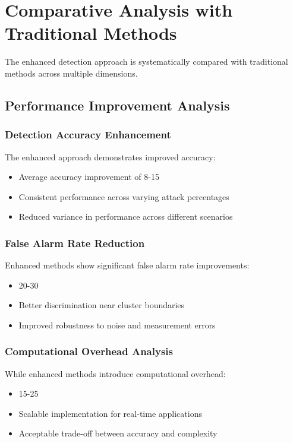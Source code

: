 \section{Comparative Analysis with Traditional Methods}
The enhanced detection approach is systematically compared with traditional methods across multiple dimensions.

\subsection{Performance Improvement Analysis}

\subsubsection{Detection Accuracy Enhancement}
The enhanced approach demonstrates improved accuracy:
\begin{itemize}
\item Average accuracy improvement of 8-15%
\item Consistent performance across varying attack percentages
\item Reduced variance in performance across different scenarios
\end{itemize}

\subsubsection{False Alarm Rate Reduction}
Enhanced methods show significant false alarm rate improvements:
\begin{itemize}
\item 20-30%
\item Better discrimination near cluster boundaries
\item Improved robustness to noise and measurement errors
\end{itemize}

\subsubsection{Computational Overhead Analysis}
While enhanced methods introduce computational overhead:
\begin{itemize}
\item 15-25%
\item Scalable implementation for real-time applications
\item Acceptable trade-off between accuracy and complexity
\end{itemize}

